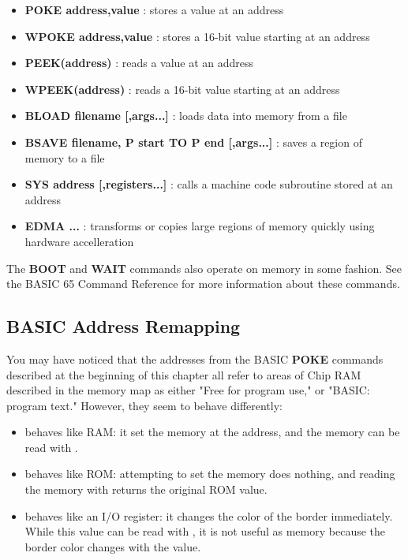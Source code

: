 \begin{itemize}
\item {\bf POKE address,value} : stores a value at an address
\item {\bf WPOKE address,value} : stores a 16-bit value starting at an address
\item {\bf PEEK(address)} : reads a value at an address
\item {\bf WPEEK(address)} : reads a 16-bit value starting at an address
\item {\bf BLOAD filename [,args...]} : loads data into memory from a file
\item {\bf BSAVE filename, P start TO P end [,args...]} : saves a region of memory to a file
\item {\bf SYS address [,registers...]} : calls a machine code subroutine
stored at an address
\item {\bf EDMA ...} : transforms or copies large regions of memory quickly
using hardware accelleration
\end{itemize}

The {\bf BOOT} and {\bf WAIT} commands also operate on memory in some fashion.
See the BASIC 65 Command Reference for more information about these commands.

\subsection{BASIC Address Remapping}

You may have noticed that the addresses from the BASIC {\bf POKE} commands
described at the beginning of this chapter all refer to areas of Chip
RAM described in the memory map as either "Free for program use," or "BASIC:
program text." However, they seem to behave differently:

\begin{itemize}
\item {} behaves like RAM: it set the memory at the address,
and the memory can be read with .
\item {} behaves like ROM: attempting to set the memory does nothing,
and reading the memory with  returns the original ROM value.
\item {} behaves like an I/O register: it changes the color of
the border immediately. While this value can be read with , it is not useful as memory because the border color changes with the value.
\end{itemize}

